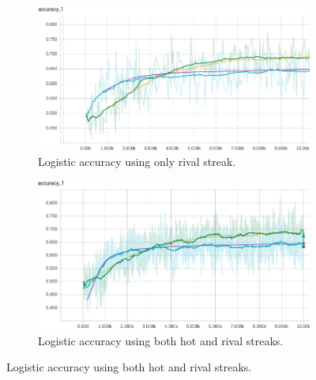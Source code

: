 \documentclass{article} %
\begin{document}
\begin{figure}[!htb]
  \begin{subfigure}{0.5\textwidth}
    \includegraphics[width=\linewidth]{plots/linear-model/streak-r/accuracy.png}
    \caption{Logistic accuracy using only rival streak.}\label{fig:linear-r-accuracy}
  \end{subfigure}
  \begin{subfigure}{0.5\textwidth}
    \includegraphics[width=\linewidth]{plots/linear-model/streak-hr/accuracy.png}
    \caption{Logistic accuracy using both hot and rival streaks.}\label{fig:linear-hr-accuracy}
  \end{subfigure}
\end{figure}
\end{document}
